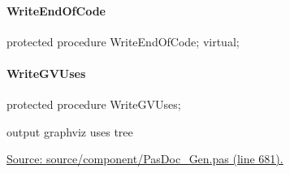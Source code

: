 \documentclass{report}
\newif\ifpdf
\begin{document}
\paragraph*{WriteEndOfCode}\hspace*{\fill}

\label{PasDoc_Gen.TDocGenerator-WriteEndOfCode}
\begin{list}{}{
\setlength{\itemindent}{0cm}
\setlength{\listparindent}{0cm}
\setlength{\leftmargin}{\evensidemargin}
\addtolength{\leftmargin}{\tmplength}
\settowidth{\labelsep}{X}
\addtolength{\leftmargin}{\labelsep}
\setlength{\labelwidth}{\tmplength}
}
\item[\textbf{Declaration}\hfill]
\ifpdf
\begin{flushleft}
\fi
\begin{ttfamily}
protected procedure WriteEndOfCode; virtual;\end{ttfamily}

\ifpdf
\end{flushleft}
\fi

\end{list}
\paragraph*{WriteGVUses}\hspace*{\fill}

\label{PasDoc_Gen.TDocGenerator-WriteGVUses}
\begin{list}{}{
\setlength{\itemindent}{0cm}
\setlength{\listparindent}{0cm}
\setlength{\leftmargin}{\evensidemargin}
\addtolength{\leftmargin}{\tmplength}
\settowidth{\labelsep}{X}
\addtolength{\leftmargin}{\labelsep}
\setlength{\labelwidth}{\tmplength}
}
\item[\textbf{Declaration}\hfill]
\ifpdf
\begin{flushleft}
\fi
\begin{ttfamily}
protected procedure WriteGVUses;\end{ttfamily}

\ifpdf
\end{flushleft}
\fi

\par
\item[\textbf{Description}]
output graphviz uses tree\par
\href{https://github.com/pasdoc/pasdoc/blob/master/source/component/PasDoc_Gen.pas#L681}{Source: source/component/PasDoc{\_}Gen.pas (line 681).}

\end{list}
\end{document}
